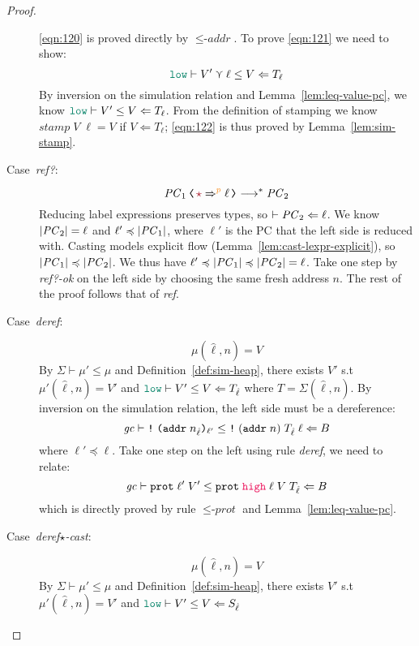 \begin{proof}
\begin{description}
  \eqref{eqn:120} is proved directly by ${\leq}\textit{-addr}$.
  To prove \eqref{eqn:121} we need to show:
  \begin{equation}
  \label{eqn:122}
  \simrel{\low}{V' \curlyvee \ell}{V}{T_\ell}
  \end{equation}
  By inversion on the simulation relation and Lemma~\ref{lem:leq-value-pc},
  we know $\simrel{\low}{V'}{V}{T_\ell}$.
  From the definition of stamping we know $\textit{stamp}\;V\;\ell = V$
  if $V \Leftarrow T_\ell$;
  \eqref{eqn:122} is thus proved by Lemma~\ref{lem:sim-stamp}.
  \item[Case~\textit{ref?}:]
  \[
  \cccast{\PC_1}{\unk \Rightarrow^{\bl{p}} \ell} \longrightarrow^{*} \PC_2
  \]
  Reducing label expressions preserves types, so $\vdash \mathit{PC}_2 \Leftarrow \ell$.
  We know $|\mathit{PC}_2| = \ell$ and $\ell' \preccurlyeq |\mathit{PC}_1|$, where $\ell'$ is the
  PC that the left side is reduced with. Casting models explicit flow
  (Lemma~\ref{lem:cast-lexpr-explicit}), so $|\mathit{PC}_1| \preccurlyeq |\mathit{PC}_2|$.
  We thus have $\ell' \preccurlyeq |\mathit{PC}_1| \preccurlyeq |\mathit{PC}_2| = \ell$. Take one step
  by \textit{ref?-ok} on the left side by choosing the same fresh address $n$.
  The rest of the proof follows that of \textit{ref}.
  \item[Case~\textit{deref}:]
  \[
  \mu(\hat{\ell},n) = V
  \]
  By $\Sigma \vdash \mu' \leq \mu$ and Definition~\ref{def:sim-heap},
  there exists $V'$ s.t $\mu'(\hat{\ell}, n) = V'$ and $\simrel{\low}{V'}{V}{T_{\hat{\ell}}}$
  where $T = \Sigma(\hat{\ell}, n)$.
  By inversion on the simulation relation, the left side must be a dereference:
  \[
  {\mathit{gc}}\vdash{\ensuremath{\text{\texttt{{!}}}\;{\text{\texttt{{(addr}}}\;{n_{\hat{\ell}}}\text{\texttt{{)}}}_{\ell'}}}}\leq{\ensuremath{\text{\texttt{{!}}}\;{(\text{\texttt{{addr}}}\;{n})}\;{T_{\hat{\ell}}}\;{\ell}}}\Leftarrow{B}
  \]
  where $\ell' \preccurlyeq \ell$. Take one step on the left using rule \textit{deref},
  we need to relate:
  \[
  \simrel{\gc}{\dynprot{\ell'}{V'}}{\ccprot{\high}{\ell}{V}{T_{\hat{\ell}}}}{B}
  \]
  which is directly proved by rule ${\leq}\textit{-prot}$ and Lemma~\ref{lem:leq-value-pc}.
  \item[Case~\textit{deref$\star$-cast}:]
  \[
  \mu(\hat{\ell}, n) = V
  \]
  By $\Sigma \vdash \mu' \leq \mu$ and Definition~\ref{def:sim-heap},
  there exists $V'$ s.t $\mu'(\hat{\ell}, n) = V'$ and $\simrel{\low}{V'}{V}{S_{\hat{\ell}}}$

\end{description}
\end{proof}
